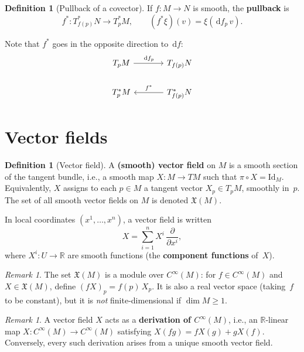 \documentclass[12pt,a4paper,openany]{book}
\theoremstyle{definition}
\newtheorem{definition}[theorem]{Definition}
\theoremstyle{remark}
\newtheorem{remark}[theorem]{Remark}
\newcommand{\R}{\mathbb{R}}
\newcommand{\Id}{\mathrm{Id}}
\newcommand{\dd}{\,\mathrm{d}}
\begin{document}
\begin{definition}[Pullback of a covector]\label{def:pullback-covector}%
If $f \colon M \to N$ is smooth, the \textbf{pullback} is
\[
  f^* \colon T^*_{f(p)}N \to T^*_pM,
  \qquad
  (f^*\xi)(v) = \xi(\dd f_p\, v).
\]
\end{definition}

Note that $f^*$ goes in the opposite direction to $\dd f$:
\[
\begin{tikzcd}[column sep=large]
  T_pM \arrow[r, "\dd f_p"] &
  T_{f(p)}N \\
  T_p^*M &
  T_{f(p)}^*N \arrow[l, "f^*"']
\end{tikzcd}
\]

\section{Vector fields}\label{sec:vector-fields}

\begin{definition}[Vector field]\label{def:vector-field}%
A \textbf{(smooth) vector field} on $M$ is a smooth section of the
tangent bundle, i.e., a smooth map $X \colon M \to TM$ such that
$\pi \circ X = \Id_M$.  Equivalently, $X$ assigns to each $p \in M$ a
tangent vector $X_p \in T_pM$, smoothly in~$p$.
The set of all smooth vector fields on $M$ is denoted
$\mathfrak{X}(M)$.
\end{definition}

In local coordinates $(x^1, \dots, x^n)$, a vector field is written
\[
  X = \sum_{i=1}^n X^i\, \frac{\partial}{\partial x^i},
\]
where $X^i \colon U \to \R$ are smooth functions (the \textbf{component
functions} of~$X$).

\begin{remark}\label{rem:vf-module}%
The set $\mathfrak{X}(M)$ is a module over $C^\infty(M)$: for
$f \in C^\infty(M)$ and $X \in \mathfrak{X}(M)$, define
$(fX)_p = f(p)\, X_p$.  It is also a real vector space (taking~$f$
to be constant), but it is \emph{not} finite-dimensional
if $\dim M \geq 1$.
\end{remark}

\begin{remark}\label{rem:vf-derivation}
A vector field $X$ acts as a \textbf{derivation of $C^\infty(M)$},
i.e., an $\R$-linear map $X \colon C^\infty(M) \to C^\infty(M)$
satisfying $X(fg) = fX(g) + gX(f)$.  Conversely, every such derivation
arises from a unique smooth vector field.
\end{remark}
\end{document}
